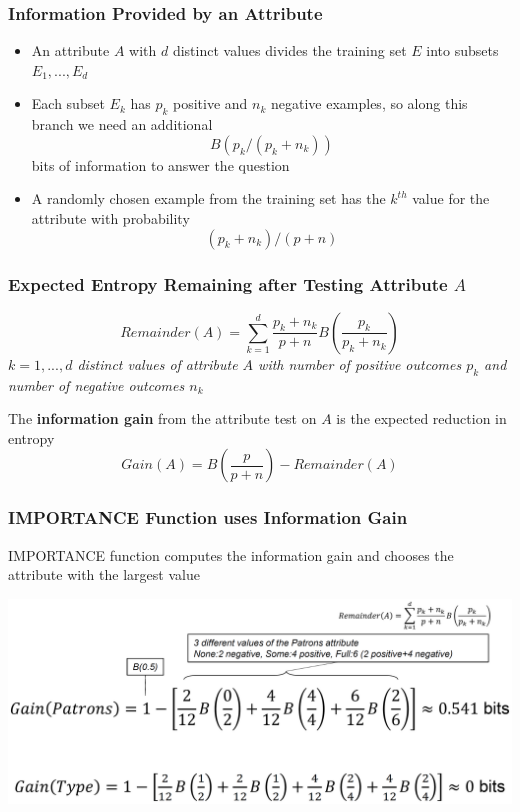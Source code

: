 \documentclass[conference, a4paper]{styles/acmsiggraph}
\begin{document}
        \subsubsection{Information Provided by an Attribute}
            \begin{itemize}
                \item An attribute $A$ with $d$ distinct values divides the training set $E$ into subsets $E_1,...,E_d$
                \item Each subset $E_k$ has $p_k$ positive and $n_k$ negative examples, so along this branch we need an additional
                $$B(p_k \slash (p_k + n_k))$$
                bits of information to answer the question
                \item A randomly chosen example from the training set has the $k^{th}$ value for the attribute with probability
                $$(p_k + n_k) \slash (p + n)$$
            \end{itemize}
            
        \subsubsection{Expected Entropy Remaining after Testing Attribute $A$}
            $$Remainder(A) = \sum\limits_{k=1}^d \frac{p_k + n_k}{p+n} B \left( \frac{p_k}{p_k + n_k} \right)$$
            \textit{$k=1,...,d$ distinct values of attribute $A$ with number of positive outcomes $p_k$ and number of negative outcomes $n_k$}
            
            The \textbf{information gain} from the attribute test on $A$ is the expected reduction in entropy
            $$Gain(A) = B \left( \frac{p}{p+n} \right) - Remainder(A)$$
        
        \subsubsection{IMPORTANCE Function uses Information Gain}
            IMPORTANCE function computes the information gain and chooses the attribute with the largest value\newline
            
            \includegraphics[width=1\textwidth]{imgs/ImportantFunction.png}
            
\end{document}
